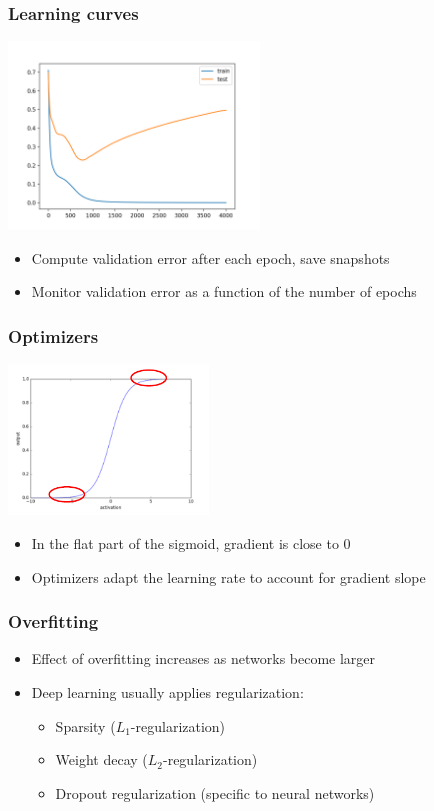 \documentclass[10pt]{beamer}
\begin{document}
\begin{frame}
\frametitle{Learning curves}
  \begin{center}
  \includegraphics[height=5cm]{images/validation.png}
  \end{center}
  \begin{itemize}
	\item Compute validation error after each epoch, save snapshots
	\item Monitor validation error as a function of the number of epochs
  \end{itemize}
\end{frame}

\begin{frame}
\frametitle{Optimizers}
  \begin{center}
  \includegraphics[height=4cm]{images/optimize.png}
  \end{center}
  \begin{itemize}
	\item In the flat part of the sigmoid, gradient is close to 0
	\item {\color{red} Optimizers} adapt the learning rate to account for gradient slope
  \end{itemize}
\end{frame}

\begin{frame}
\frametitle{Overfitting}
\begin{itemize}
\item Effect of overfitting increases as networks become larger
\item Deep learning usually applies {\color{red} regularization}:
\begin{itemize}
\item Sparsity ($L_1$-regularization)
\item Weight decay ($L_2$-regularization)
\item {\color{blue} Dropout regularization} (specific to neural networks)
\end{itemize}
\end{itemize}
\end{frame}
\end{document}
